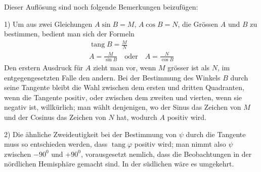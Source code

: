 Dieser Auflösung sind noch folgende Bemerkungen beizufügen:

1) Um aus zwei Gleichungen $A\sin B=M$, $A\cos B=N$, die Grössen
$A$ und $B$ zu bestimmen, bedient man sich der Formeln
\[
\begin{gathered}
\operatorname{tang}B=\frac{M}{N}\\
A=\frac{M}{\sin B}\quad\text{oder}\quad A=\frac{N}{\cos B}
\end{gathered}
\]
Den erstern Ausdruck für $A$ zieht man vor, wenn $M$ grösser ist als $N$, im entgegengesetzten
Falle den andern. Bei der Bestimmung des Winkels $B$ durch
seine Tangente bleibt die Wahl zwischen dem ersten und dritten Quadranten, wenn
die Tangente positiv, oder zwischen dem zweiten und vierten, wenn sie negativ
ist, willkürlich; man wählt denjenigen, wo der Sinus das Zeichen von $M$ und
der Cosinus das Zeichen von $N$ hat, wodurch $A$ positiv wird.

2) Die ähnliche Zweideutigkeit bei der Bestimmung von $\psi$ durch die Tangente
muss so entschieden werden, dass $\operatorname{tang}\varphi$ positiv wird; man nimmt also
$\psi$ zwischen $-90^0$ und $+90^0$, vorausgesetzt nemlich, dass die Beobachtungen
in der nördlichen Hemisphäre gemacht sind. In der südlichen wäre es umgekehrt.

